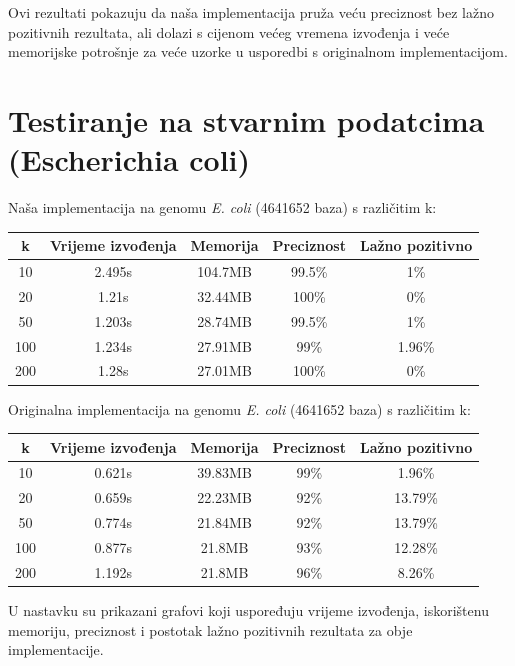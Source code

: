 \documentclass[seminarskirad]{fer}
\begin{document}
Ovi rezultati pokazuju da naša implementacija pruža veću preciznost bez lažno pozitivnih rezultata, ali dolazi s cijenom većeg vremena izvođenja i veće memorijske potrošnje za veće uzorke u usporedbi s originalnom implementacijom.


\section{Testiranje na stvarnim podatcima (Escherichia coli)}
Naša implementacija na genomu \textit{E. coli} (4641652 baza) s različitim k:

\begin{center}
	\small
	\begin{tabular}{||c c c c c||} 
		\hline
		k & Vrijeme izvođenja & Memorija & Preciznost & Lažno pozitivno \\ [0.5ex] 
		\hline\hline
		10 & 2.495s & 104.7MB & 99.5\% & 1\% \\ 
		\hline
		20 & 1.21s & 32.44MB & 100\% & 0\% \\
		\hline
		50 & 1.203s & 28.74MB & 99.5\% & 1\% \\
		\hline
		100 & 1.234s & 27.91MB & 99\% & 1.96\% \\
		\hline
		200 & 1.28s & 27.01MB & 100\% & 0\% \\ [1ex] 
		\hline
	\end{tabular}
\end{center}

Originalna implementacija na genomu \textit{E. coli} (4641652 baza) s različitim k:

\begin{center}
	\small
	\begin{tabular}{||c c c c c||} 
		\hline
		k & Vrijeme izvođenja & Memorija & Preciznost & Lažno pozitivno \\ [0.5ex] 
		\hline\hline
		10 & 0.621s & 39.83MB & 99\% & 1.96\% \\ 
		\hline
		20 & 0.659s & 22.23MB & 92\% & 13.79\% \\
		\hline
		50 & 0.774s & 21.84MB & 92\% & 13.79\% \\
		\hline
		100 & 0.877s & 21.8MB & 93\% & 12.28\% \\
		\hline
		200 & 1.192s & 21.8MB & 96\% & 8.26\% \\ [1ex] 
		\hline
	\end{tabular}
\end{center}

U nastavku su prikazani grafovi koji uspoređuju vrijeme izvođenja, iskorištenu memoriju, preciznost i postotak lažno pozitivnih rezultata za obje implementacije.
\end{document}
